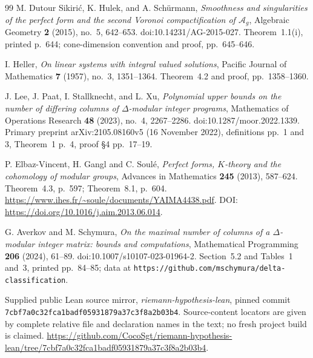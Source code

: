 \documentclass[11pt,a4paper]{article}
\theoremstyle{definition}
\begin{document}
\begin{thebibliography}{99}
M. Dutour Sikiri\'c, K. Hulek, and A. Sch\"urmann,
\emph{Smoothness and singularities of the perfect form and the second
Voronoi compactification of $\mathcal A_g$},
Algebraic Geometry \textbf{2} (2015), no.~5, 642--653.
doi:10.14231/AG-2015-027.
Theorem~1.1(i), printed p.~644; cone-dimension convention and proof,
pp.~645--646.


I. Heller, \emph{On linear systems with integral valued solutions},
Pacific Journal of Mathematics \textbf{7} (1957), no.~3, 1351--1364.
Theorem~4.2 and proof, pp.~1358--1360.


J. Lee, J. Paat, I. Stallknecht, and L. Xu,
\emph{Polynomial upper bounds on the number of differing columns of
$\Delta$-modular integer programs},
Mathematics of Operations Research \textbf{48} (2023), no.~4, 2267--2286.
doi:10.1287/moor.2022.1339.
Primary preprint arXiv:2105.08160v5 (16 November 2022),
definitions pp.~1 and 3, Theorem~1 p.~4, proof \S4 pp.~17--19.

P. Elbaz-Vincent, H. Gangl and C. Soul\'e,
\emph{Perfect forms, $K$-theory and the cohomology of modular groups},
Advances in Mathematics \textbf{245} (2013), 587--624.
Theorem~4.3, p.~597; Theorem~8.1, p.~604.
\url{https://www.ihes.fr/~soule/documents/YAIMA4438.pdf}.
DOI: \url{https://doi.org/10.1016/j.aim.2013.06.014}.

G. Averkov and M. Schymura,
\emph{On the maximal number of columns of a $\Delta$-modular integer
matrix: bounds and computations},
Mathematical Programming \textbf{206} (2024), 61--89.
doi:10.1007/s10107-023-01964-2.
Section~5.2 and Tables~1 and~3, printed pp.~84--85;
data at \texttt{https://github.com/mschymura/delta-classification}.

Supplied public Lean source mirror,
\emph{riemann-hypothesis-lean},
pinned commit
\texttt{7cbf7a0c32fca1badf05931879a37c3f8a2b03b4}.
Source-content locators are given by complete relative file and
declaration names in the text; no fresh project build is claimed.
\url{https://github.com/CocoSgt/riemann-hypothesis-lean/tree/7cbf7a0c32fca1badf05931879a37c3f8a2b03b4}.

\end{thebibliography}
\end{document}
